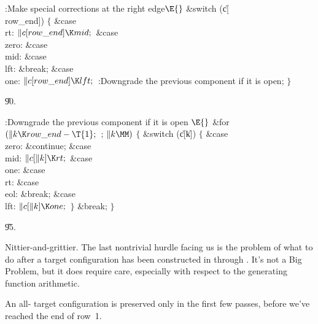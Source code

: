 \B{}:Make special corrections at the right edge\X${}%
\E{}$\6
\&{switch} (\|c[\\{row\_end}])\5
${}\{{}$\1\6
\4\&{case} \\{rt}:\5
${}\|c[\\{row\_end}]\K\\{mid};{}$\6
\4\&{case} \\{zero}:\5
\&{case} \\{mid}:\5
\&{case} \\{lft}:\5
\&{break};\6
\4\&{case} \\{one}:\5
${}\|c[\\{row\_end}]\K\\{lft};{}$\6
:Downgrade the previous component if it is open\X;\6
\4${}\}{}$\2\par
\U90.\fi

\B{}:Downgrade the previous component if it is open%
\X${}\E{}$\6
\&{for} ${}(\|k\K\\{row\_end}-\T{1};{}$  ; ${}\|k\MM){}$\5
${}\{{}$\1\6
\&{switch} (\|c[\|k])\5
${}\{{}$\1\6
\4\&{case} \\{zero}:\5
\&{continue};\6
\4\&{case} \\{mid}:\5
${}\|c[\|k]\K\\{rt};{}$\6
\4\&{case} \\{one}:\5
\&{case} \\{rt}:\5
\&{case} \\{eol}:\5
\&{break};\6
\4\&{case} \\{lft}:\5
${}\|c[\|k]\K\\{one};{}$\6
\4${}\}{}$\2\6
\&{break};\6
\4${}\}{}$\2\par
\U95.\fi

Nittier-and-grittier. The last nontrivial hurdle
facing us
is the problem of what to do after a target configuration has
been constructed in  through . It's not a Big
Problem,
but it does require care, especially with respect to the
generating function arithmetic.

An all- target configuration is preserved only in the
first few passes, before we've reached the end of row~1.

